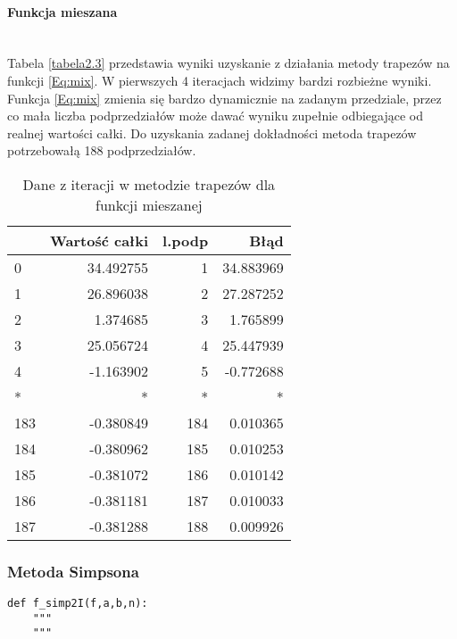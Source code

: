 \documentclass[12pt,twoside]{article}
\begin{document}
\paragraph{Funkcja mieszana}\mbox{} \\

Tabela \eqref{tabela2.3} przedstawia wyniki uzyskanie z działania metody trapezów na funkcji \eqref{Eq:mix}. W pierwszych 4 iteracjach widzimy bardzi rozbieżne wyniki. Funkcja \eqref{Eq:mix} zmienia się bardzo dynamicznie na zadanym przedziale, przez co mała liczba podprzedziałów może dawać wyniku zupełnie odbiegające od realnej wartości całki. Do uzyskania zadanej dokładności metoda trapezów potrzebowałą 188 podprzedziałów.

\begin{table}[H]
\centering
\caption{Dane z iteracji w metodzie trapezów dla funkcji mieszanej}
\label{tabela2.3}
\begin{tabular}{lrrr}
\toprule
{} &  Wartość całki &  l.podp &       Błąd \\
\midrule
0   &      34.492755 &       1 &  34.883969 \\
1   &      26.896038 &       2 &  27.287252 \\
2   &       1.374685 &       3 &   1.765899 \\
3   &      25.056724 &       4 &  25.447939 \\
4   &      -1.163902 &       5 &  -0.772688 \\
*   &       * &       * &   * \\
183 &      -0.380849 &     184 &   0.010365 \\
184 &      -0.380962 &     185 &   0.010253 \\
185 &      -0.381072 &     186 &   0.010142 \\
186 &      -0.381181 &     187 &   0.010033 \\
187 &      -0.381288 &     188 &   0.009926 \\
\bottomrule
\end{tabular}

\end{table}

\subsubsection{Metoda Simpsona}

\begin{lstlisting}[caption={Kod w języku python implementujący metodę prostokątów}]
def f_simp2I(f,a,b,n):
    """
    """
\end{lstlisting}
\label{Listing 8}
\end{document}
